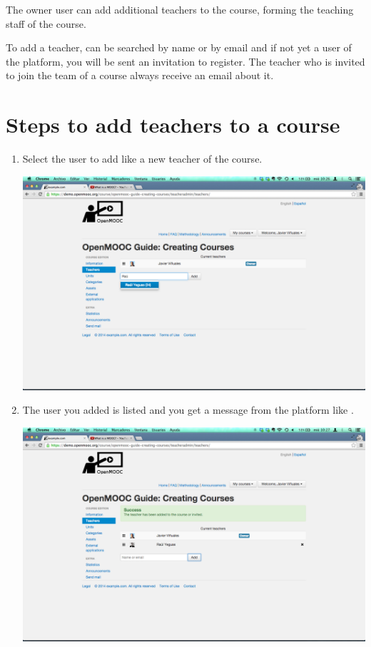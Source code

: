 \documentclass[letterpaper,10pt,english]{sphinxmanual}
\begin{document}
The owner user can add additional teachers to the course, forming the
teaching staff of the course.

To add a teacher, can be searched by name or by email and if not yet a user of the platform,
you will be sent an invitation to register. The teacher who is invited to join the team of a
course always receive an email about it.


\section{Steps to add teachers to a course}
\label{course_teachers:steps-to-add-teachers-to-a-course}\begin{enumerate}
\item {} 
Select the user to add like a new teacher of the course.

\includegraphics{3_course_teachers-2.png}

\item {} 
The user you added is listed and you get a message from the platform like .

\includegraphics{3_course_teachers-3.png}


\end{enumerate}
\end{document}
